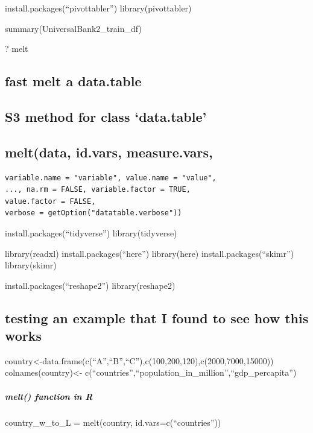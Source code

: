 \documentclass[
]{article}
\begin{document}
install.packages(``pivottabler'') library(pivottabler)

summary(UniversalBank2\_train\_df)

? melt

\hypertarget{fast-melt-a-data.table}{%
\subsection{fast melt a data.table}\label{fast-melt-a-data.table}}

\hypertarget{s3-method-for-class-data.table}{%
\subsection{S3 method for class
`data.table'}\label{s3-method-for-class-data.table}}

\hypertarget{meltdata-id.vars-measure.vars}{%
\subsection{melt(data, id.vars,
measure.vars,}\label{meltdata-id.vars-measure.vars}}

\begin{verbatim}
variable.name = "variable", value.name = "value",
..., na.rm = FALSE, variable.factor = TRUE,
value.factor = FALSE,
verbose = getOption("datatable.verbose"))
\end{verbatim}

install.packages(``tidyverse'') library(tidyverse)

library(readxl) install.packages(``here'') library(here)
install.packages(``skimr'') library(skimr)

install.packages(``reshape2'') library(reshape2)

\hypertarget{testing-an-example-that-i-found-to-see-how-this-works}{%
\subsection{testing an example that I found to see how this
works}\label{testing-an-example-that-i-found-to-see-how-this-works}}

country\textless-data.frame(c(``A'',``B'',``C''),c(100,200,120),c(2000,7000,15000))
colnames(country)\textless-
c(``countries'',``population\_in\_million'',``gdp\_percapita'')

\hypertarget{melt-function-in-r}{%
\subparagraph{melt() function in R}\label{melt-function-in-r}}

country\_w\_to\_L = melt(country, id.vars=c(``countries''))
\end{document}
